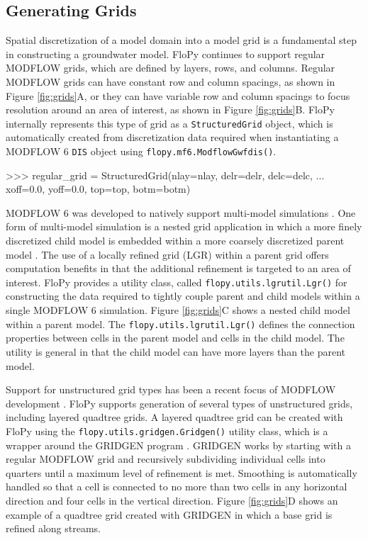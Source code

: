 \documentclass[11pt, oneside]{article}   	%
\begin{document}
\subsection{Generating Grids}

Spatial discretization of a model domain into a model grid is a fundamental step in constructing a groundwater model.  FloPy continues to support regular MODFLOW grids, which are defined by layers, rows, and columns.  Regular MODFLOW grids can have constant row and column spacings, as shown in Figure \ref{fig:grids}A, or they can have variable row and column spacings to focus resolution around an area of interest, as shown in Figure \ref{fig:grids}B.  FloPy internally represents this type of grid as a \texttt{StructuredGrid} object, which is automatically created from discretization data required when instantiating a MODFLOW 6 \texttt{DIS} object using \texttt{flopy.mf6.ModflowGwfdis()}.  

\begin{python}
>>> regular_grid = StructuredGrid(nlay=nlay, delr=delr, delc=delc,  
... xoff=0.0, yoff=0.0, top=top, botm=botm)
\end{python}

MODFLOW 6 was developed to natively support multi-model simulations \citep{modflow6framework}. One form of multi-model simulation is a nested grid application in which a more finely discretized child model is embedded within a more coarsely discretized parent model \citep{modflowlgr, vilhelmsen2012evaluation, modflowlgr2}.  The use of a locally refined grid (LGR) within a parent grid offers computation benefits in that the additional refinement is targeted to an area of interest.  FloPy provides a utility class, called \texttt{flopy.utils.lgrutil.Lgr()} for constructing the data required to tightly couple parent and child models within a single MODFLOW 6 simulation.   Figure \ref{fig:grids}C shows a nested child model within a parent model.  The \texttt{flopy.utils.lgrutil.Lgr()} defines the connection properties between cells in the parent model and cells in the child model.  The utility is general in that the child model can have more layers than the parent model.

Support for unstructured grid types has been a recent focus of MODFLOW development \citep{modflowusg, modflow6gwf, modflow6xt3d}.  FloPy supports generation of several types of unstructured grids, including layered quadtree grids.  A layered quadtree grid can be created with FloPy using the \texttt{flopy.utils.gridgen.Gridgen()} utility class, which is a wrapper around the GRIDGEN program \citep{gridgen}.  GRIDGEN works by starting with a regular MODFLOW grid and recursively subdividing individual cells into quarters until a maximum level of refinement is met.  Smoothing is automatically handled so that a cell is connected to no more than two cells in any horizontal direction and four cells in the vertical direction.   Figure \ref{fig:grids}D shows an example of a quadtree grid created with GRIDGEN in which a base grid is refined along streams.
\end{document}
